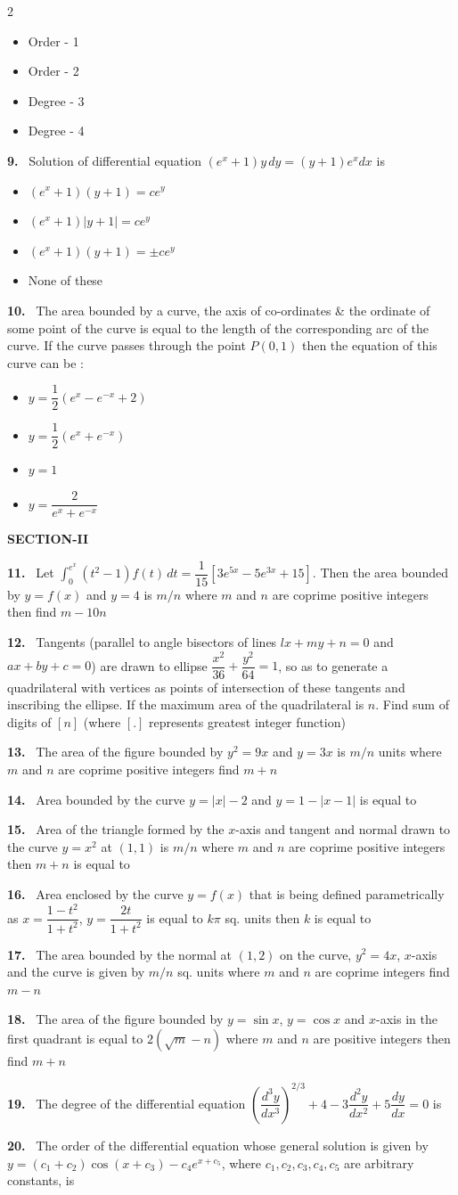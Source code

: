 \documentclass[10pt]{extarticle}
\newcommand{\sect}[1]{\par\smallskip\noindent\textbf{#1}\par}
\newcommand{\qn}[1]{\par\smallskip\noindent\textbf{#1.}~}
\newenvironment{qoptions}{\begin{itemize}[leftmargin=1.8em,itemsep=1pt,topsep=2pt,label={}]}{\end{itemize}}
\newcommand{\opt}[2]{\item[(#1)] #2}
\begin{document}
\begin{multicols}{2}
\begin{qoptions}
\opt{A}{Order - 1}
\opt{B}{Order - 2}
\opt{C}{Degree - 3}
\opt{D}{Degree - 4}
\end{qoptions}
\qn{9} Solution of differential equation $\left(e^x+1\right)y\,dy=(y+1)e^x dx$ is
\begin{qoptions}
\opt{A}{$\left(e^x+1\right)(y+1)=ce^y$}
\opt{B}{$\left(e^x+1\right)\left|y+1\right|=ce^y$}
\opt{C}{$\left(e^x+1\right)(y+1)=\pm ce^y$}
\opt{D}{None of these}
\end{qoptions}
\qn{10} The area bounded by a curve, the axis of co-ordinates \& the ordinate of some point of the curve is equal to the length of the corresponding arc of the curve. If the curve passes through the point $P(0,1)$ then the equation of this curve can be :
\begin{qoptions}
\opt{A}{$y=\dfrac12\left(e^x-e^{-x}+2\right)$}
\opt{B}{$y=\dfrac12\left(e^x+e^{-x}\right)$}
\opt{C}{$y=1$}
\opt{D}{$y=\dfrac{2}{e^x+e^{-x}}$}
\end{qoptions}
\sect{SECTION-II}
\qn{11} Let $\displaystyle\int_0^{e^x}\left(t^2-1\right)f(t)\,dt=\dfrac1{15}\left[3e^{5x}-5e^{3x}+15\right]$. Then the area bounded by $y=f(x)$ and $y=4$ is $m/n$ where $m$ and $n$ are coprime positive integers then find $m-10n$
\qn{12} Tangents (parallel to angle bisectors of lines $lx+my+n=0$ and $ax+by+c=0$) are drawn to ellipse $\dfrac{x^2}{36}+\dfrac{y^2}{64}=1$, so as to generate a quadrilateral with vertices as points of intersection of these tangents and inscribing the ellipse. If the maximum area of the quadrilateral is $n$. Find sum of digits of $[n]$ (where $[.]$ represents greatest integer function)
\qn{13} The area of the figure bounded by $y^2=9x$ and $y=3x$ is $m/n$ units where $m$ and $n$ are coprime positive integers find $m+n$
\qn{14} Area bounded by the curve $y=|x|-2$ and $y=1-|x-1|$ is equal to
\qn{15} Area of the triangle formed by the $x$-axis and tangent and normal drawn to the curve $y=x^2$ at $(1,1)$ is $m/n$ where $m$ and $n$ are coprime positive integers then $m+n$ is equal to
\qn{16} Area enclosed by the curve $y=f(x)$ that is being defined parametrically as $x=\dfrac{1-t^2}{1+t^2}$, $y=\dfrac{2t}{1+t^2}$ is equal to $k\pi$ sq. units then $k$ is equal to
\qn{17} The area bounded by the normal at $(1,2)$ on the curve, $y^2=4x$, $x$-axis and the curve is given by $m/n$ sq. units where $m$ and $n$ are coprime integers find $m-n$
\qn{18} The area of the figure bounded by $y=\sin x$, $y=\cos x$ and $x$-axis in the first quadrant is equal to $2\left(\sqrt m-n\right)$ where $m$ and $n$ are positive integers then find $m+n$
\qn{19} The degree of the differential equation $\left(\dfrac{d^3y}{dx^3}\right)^{2/3}+4-3\dfrac{d^2y}{dx^2}+5\dfrac{dy}{dx}=0$ is
\qn{20} The order of the differential equation whose general solution is given by $y=(c_1+c_2)\cos(x+c_3)-c_4e^{x+c_5}$, where $c_1,c_2,c_3,c_4,c_5$ are arbitrary constants, is
\end{multicols}
\end{document}
